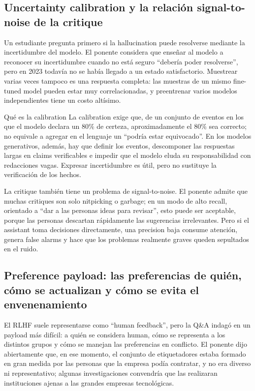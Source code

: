 \subsection{Uncertainty calibration y la relación signal-to-noise de la critique}

Un estudiante pregunta primero si la hallucination puede resolverse mediante la incertidumbre del modelo. El ponente considera que enseñar al modelo a reconocer su incertidumbre cuando no está seguro ``debería poder resolverse'', pero en 2023 todavía no se había llegado a un estado satisfactorio. Muestrear varias veces tampoco es una respuesta completa: las muestras de un mismo fine-tuned model pueden estar muy correlacionadas, y preentrenar varios modelos independientes tiene un costo altísimo.

\begin{warningbox}{Qué es la calibration}
La calibration exige que, de un conjunto de eventos en los que el modelo declara un 80\% de certeza, aproximadamente el 80\% sea correcto; no equivale a agregar en el lenguaje un ``podría estar equivocado''. En los modelos generativos, además, hay que definir los eventos, descomponer las respuestas largas en claims verificables e impedir que el modelo eluda su responsabilidad con redacciones vagas. Expresar incertidumbre es útil, pero no sustituye la verificación de los hechos.
\end{warningbox}

La critique también tiene un problema de signal-to-noise. El ponente admite que muchas critiques son solo nitpicking o garbage; en un modo de alto recall, orientado a ``dar a las personas ideas para revisar'', esto puede ser aceptable, porque las personas descartan rápidamente las sugerencias irrelevantes. Pero si el assistant toma decisiones directamente, una precision baja consume atención, genera false alarms y hace que los problemas realmente graves queden sepultados en el ruido.

\subsection{Preference payload: las preferencias de quién, cómo se actualizan y cómo se evita el envenenamiento}

El RLHF suele representarse como ``human feedback'', pero la Q\&A indagó en un payload más difícil: a quién se considera human, cómo se representa a los distintos grupos y cómo se manejan las preferencias en conflicto. El ponente dijo abiertamente que, en ese momento, el conjunto de etiquetadores estaba formado en gran medida por las personas que la empresa podía contratar, y no era diverso ni representativo; algunas investigaciones convendría que las realizaran instituciones ajenas a las grandes empresas tecnológicas.

